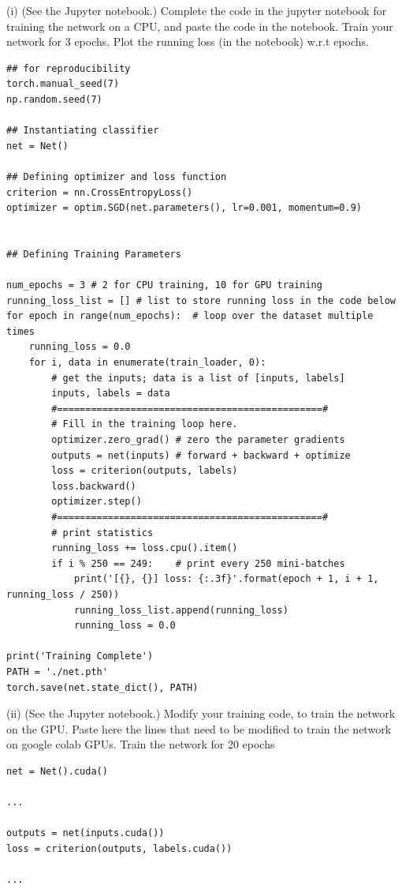 \documentclass[answers]{exam}
\begin{document}
(i) (See the Jupyter notebook.) Complete the code in the jupyter notebook for training the network on a CPU, and paste the code in the notebook. Train your network for 3 epochs. Plot the running loss (in the notebook) w.r.t epochs. 
\begin{solution}
\begin{verbatim}
## for reproducibility
torch.manual_seed(7)
np.random.seed(7)

## Instantiating classifier
net = Net()

## Defining optimizer and loss function
criterion = nn.CrossEntropyLoss()
optimizer = optim.SGD(net.parameters(), lr=0.001, momentum=0.9)


## Defining Training Parameters

num_epochs = 3 # 2 for CPU training, 10 for GPU training
running_loss_list = [] # list to store running loss in the code below 
for epoch in range(num_epochs):  # loop over the dataset multiple times
    running_loss = 0.0
    for i, data in enumerate(train_loader, 0):
        # get the inputs; data is a list of [inputs, labels]
        inputs, labels = data
        #===============================================#
        # Fill in the training loop here.
        optimizer.zero_grad() # zero the parameter gradients
        outputs = net(inputs) # forward + backward + optimize
        loss = criterion(outputs, labels)
        loss.backward()
        optimizer.step()
        #===============================================#
        # print statistics
        running_loss += loss.cpu().item()
        if i % 250 == 249:    # print every 250 mini-batches
            print('[{}, {}] loss: {:.3f}'.format(epoch + 1, i + 1, running_loss / 250))
            running_loss_list.append(running_loss)
            running_loss = 0.0
            
print('Training Complete')
PATH = './net.pth'
torch.save(net.state_dict(), PATH)
\end{verbatim}
\end{solution}

(ii) (See the Jupyter notebook.) Modify your training code, to train the network on the GPU. Paste here the lines that need to be modified to train the network on google colab GPUs. Train the network for 20 epochs
\begin{solution}
\begin{verbatim}
net = Net().cuda()

...

outputs = net(inputs.cuda())
loss = criterion(outputs, labels.cuda())

...
\end{verbatim}
\end{solution}
\end{document}
